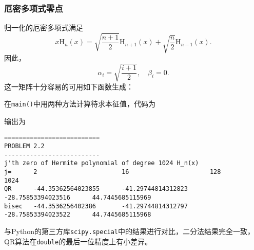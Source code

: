 \documentclass[a4paper,unicode]{report}
\begin{document}
\subsubsection{厄密多项式零点}
归一化的厄密多项式满足
\begin{equation}
    x\mathrm{H}_n(x) = \sqrt{\frac{n+1}{2}}\mathrm{H}_{n+1}(x) + \sqrt{\frac{n}{2}}\mathrm{H}_{n-1}(x).
\end{equation}
因此，
\begin{equation}
    \alpha_i = \sqrt{\frac{i+1}{2}},\quad \beta_i = 0.
\end{equation}
这一矩阵十分容易的可用如下函数生成：
{
    \linespread{1.0}
    
    
}
在\texttt{main()}中用两种方法计算待求本征值，代码为
{
    \linespread{1.0}
    
}
输出为
{
\footnotesize
\begin{verbatim}
==========================
PROBLEM 2.2
--------------------------
j'th zero of Hermite polynomial of degree 1024 H_n(x)
j=      2                       16                      128                     1024
QR      -44.35362564023855      -41.29744814312823      -28.75853394023516      44.7445685115969
bisec   -44.3536256402386       -41.29744814312797      -28.75853394023522      44.7445685115968
\end{verbatim}
}
与\textsf{Python}的第三方库\texttt{scipy.special}中的结果进行对比，二分法结果完全一致，QR算法在\texttt{double}的最后一位精度上有小差异。
\end{document}
